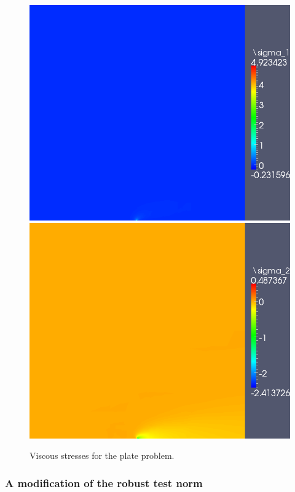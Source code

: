 \documentclass[letterpaper]{article}
\begin{document}
\begin{figure}[!h]
\centering
\includegraphics[scale=.275]{figs/LaplaceFigs/confusion1e2h1e3Sigma1.png}
\includegraphics[scale=.275]{figs/LaplaceFigs/confusion1e2h1e3Sigma2.png}
\caption{Viscous stresses for the plate problem.  }
\label{fig:plateStresses}
\end{figure}

\subsubsection{A modification of the robust test norm}
\end{document}
